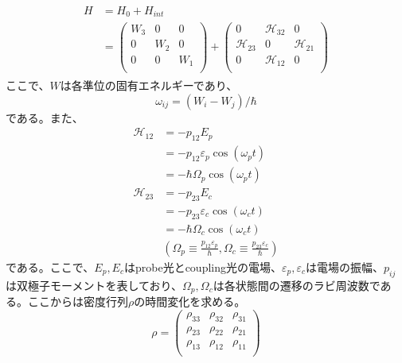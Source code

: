 \documentclass[dvipdfmx]{jsreport}
\begin{document}
\begin{align}
\begin{split}
H &= H_0 + H_{int} \\
&= 
    \begin{pmatrix} 
        W_3 & 0 & 0 \\
        0 & W_2 & 0 \\
        0 & 0 & W_1 \\
    \end{pmatrix}
    +
    \begin{pmatrix} 
        0 & \mathcal{H}_{32} & 0 \\
        \mathcal{H}_{23} & 0 & \mathcal{H}_{21} \\
        0 & \mathcal{H}_{12} & 0 \\
    \end{pmatrix}
\end{split}
\end{align}
ここで、$W$は各準位の固有エネルギーであり、
\begin{equation}
    \omega_{ij} = (W_i - W_j) / \hbar
\end{equation}
である。また、
\begin{equation}
\begin{split}
\mathcal{H}_{12} &= -p_{12}E_p\\
&= -p_{12} \varepsilon_p \cos{(\omega_p t)} \\
&= -\hbar \Omega_p \cos{(\omega_p t)} \\
\mathcal{H}_{23} &= -p_{23}E_c \\
&= -p_{23} \varepsilon_c \cos{(\omega_c t)} \\
&= -\hbar \Omega_c \cos{(\omega_c t)} \\
&\left( \Omega_p \equiv \frac{p_{12}\varepsilon_p}{\hbar} , \Omega_c \equiv \frac{p_{23}\varepsilon_c}{\hbar} \right) 
\end{split}
\end{equation}
である。ここで、$E_p, E_c$はprobe光とcoupling光の電場、$\varepsilon_p, \varepsilon_c$は電場の振幅、$p_{ij}$は双極子モーメントを表しており、$\Omega_p, \Omega_c$は各状態間の遷移のラビ周波数である。ここからは密度行列$\rho$の時間変化を求める。
\begin{equation}
\rho = 
\begin{pmatrix} 
        \rho_{33} & \rho_{32} & \rho_{31} \\
        \rho_{23} & \rho_{22} & \rho_{21} \\
        \rho_{13} & \rho_{12} & \rho_{11} \\
\end{pmatrix}
\end{equation}
\end{document}
